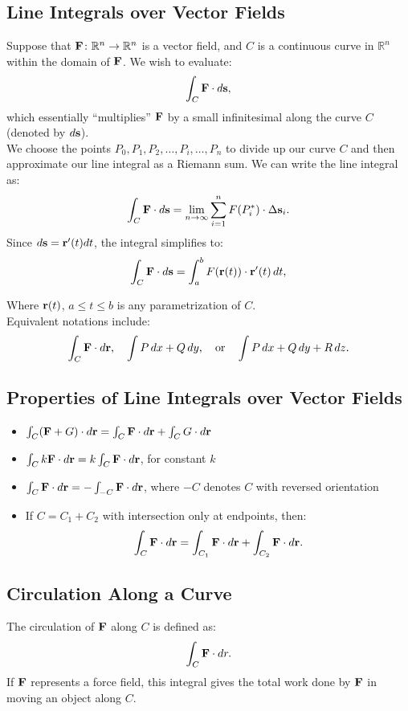 \subsection{Line Integrals over Vector Fields}
Suppose that \(\mathbf{F} \colon \mathbb{R}^n \to \mathbb{R}^n\) is a vector field, and \(C\) is a continuous curve in \(\mathbb{R}^n\) within the domain of \(\mathbf{F}\). We wish to evaluate:
\[
    \int_C \mathbf{F} \cdot d\mathbf{s}, 
\]
which essentially ``multiplies'' \(\mathbf{F}\) by a small infinitesimal along the curve \(C\) (denoted by \(d\mathbf{s}\)). \\

We choose the points \(P_{0}, P_{1}, P_{2}, \ldots, P_{i},\ldots, P_{n}\) to divide up our curve \(C\) and then approximate our line integral as a Riemann sum. We can write the line integral as:
\[
    \int_C \mathbf{F} \cdot d\mathbf{s} = \lim_{n\to\infty} \sum_{i=1}^{n} F(P^*_i) \cdot \Delta \mathbf{s}_i. 
\]
Since \(d\mathbf{s} = \mathbf{r}'(t) dt\), the integral simplifies to:
\[
    \int_C \mathbf{F} \cdot d\mathbf{s} = \int_a^b F(\mathbf{r}(t)) \cdot \mathbf{r}'(t) \, dt, 
\]

Where \(\mathbf{r}(t)\), \(a \leq t \leq b\) is any parametrization of \(C\). \\ 

Equivalent notations include:
\[
    \int_C \mathbf{F} \cdot d\mathbf{r}, \quad \int P \, dx + Q \, dy, \quad \text{or} \quad \int P \, dx + Q \, dy + R \, dz. 
\]

\subsection{Properties of Line Integrals over Vector Fields}
\begin{itemize}
    \item \(\int_C (\mathbf{F} + G) \cdot d\mathbf{r} = \int_C \mathbf{F} \cdot d\mathbf{r} + \int_C G \cdot d\mathbf{r}\)
    \item \(\int_C k\mathbf{F} \cdot d\mathbf{r} = k \int_C \mathbf{F} \cdot d\mathbf{r}\), for constant \(k\)
    \item \(\int_C \mathbf{F} \cdot d\mathbf{r} = - \int_{-C} \mathbf{F} \cdot d\mathbf{r}\), where \(-C\) denotes \(C\) with reversed orientation
    \item If \(C = C_1 + C_2\) with intersection only at endpoints, then:
    \[
    \int_C \mathbf{F} \cdot d\mathbf{r} = \int_{C_1} \mathbf{F} \cdot d\mathbf{r} + \int_{C_2} \mathbf{F} \cdot d\mathbf{r}. 
\]
\end{itemize}

\subsection{Circulation Along a Curve}
The circulation of \(\mathbf{F}\) along \(C\) is defined as:
\[
    \int_C \mathbf{F} \cdot dr. 
\]
If \(\mathbf{F}\) represents a force field, this integral gives the total work done by \(\mathbf{F}\) in moving an object along \(C\).

